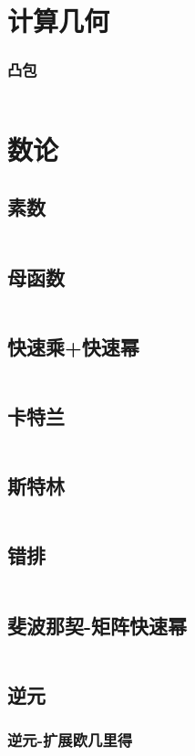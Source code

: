 \documentclass[a4paper,11pt]{article}
\begin{document}
\section{计算几何}
\subsubsection{凸包}
\inputminted[breaklines]{c++}{计算几何/凸包.cpp}
\section{数论}
\subsection{素数}
\inputminted[breaklines]{c++}{数论/素数-筛法.cpp}
\subsection{母函数}
\inputminted[breaklines]{c++}{数论/母函数.cpp}
\subsection{快速乘+快速幂}
\inputminted[breaklines]{c++}{数论/快速幂+快速乘.cpp}
\subsection{卡特兰}
\inputminted[breaklines]{c++}{数论/卡特兰数列.cpp}
\subsection{斯特林}
\inputminted[breaklines]{c++}{数论/斯特林.cpp}
\subsection{错排}
\inputminted[breaklines]{c++}{数论/错排.cpp}
\subsection{斐波那契-矩阵快速幂}
\inputminted[breaklines]{c++}{数论/斐波那契-矩阵快速幂.cpp}
\subsection{逆元}
\subsubsection{逆元-扩展欧几里得}
\inputminted[breaklines]{c++}{数论/逆元-扩展欧几里得.cpp}
\end{document}
